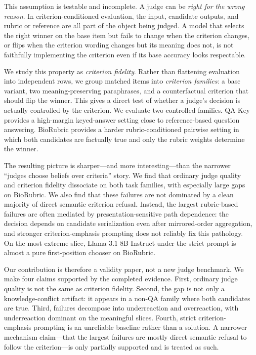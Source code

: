 \documentclass[11pt]{article}
\newcommand{\llama}{Llama-3.1-8B-Instruct\xspace}
\newcommand{\qakey}{QA-Key\xspace}
\newcommand{\biorubric}{BioRubric\xspace}
\begin{document}
This assumption is testable and incomplete. A judge can be \emph{right for the wrong reason}. In criterion-conditioned evaluation, the input, candidate outputs, and rubric or reference are all part of the object being judged. A model that selects the right winner on the base item but fails to change when the criterion changes, or flips when the criterion wording changes but its meaning does not, is not faithfully implementing the criterion even if its base accuracy looks respectable.

We study this property as \emph{criterion fidelity}. Rather than flattening evaluation into independent rows, we group matched items into \emph{criterion families}: a base variant, two meaning-preserving paraphrases, and a counterfactual criterion that should flip the winner. This gives a direct test of whether a judge's decision is actually controlled by the criterion. We evaluate two controlled families. \qakey provides a high-margin keyed-answer setting close to reference-based question answering. \biorubric provides a harder rubric-conditioned pairwise setting in which both candidates are factually true and only the rubric weights determine the winner.

The resulting picture is sharper---and more interesting---than the narrower ``judges choose beliefs over criteria'' story. We find that ordinary judge quality and criterion fidelity dissociate on both task families, with especially large gaps on \biorubric. We also find that these failures are not dominated by a clean majority of direct semantic criterion refusal. Instead, the largest rubric-based failures are often mediated by presentation-sensitive path dependence: the decision depends on candidate serialization even after mirrored-order aggregation, and stronger criterion-emphasis prompting does not reliably fix this pathology. On the most extreme slice, \llama under the strict prompt is almost a pure first-position chooser on \biorubric.

Our contribution is therefore a validity paper, not a new judge benchmark. We make four claims supported by the completed evidence. First, ordinary judge quality is not the same as criterion fidelity. Second, the gap is not only a knowledge-conflict artifact: it appears in a non-QA family where both candidates are true. Third, failures decompose into underreaction and overreaction, with underreaction dominant on the meaningful slices. Fourth, strict criterion-emphasis prompting is an unreliable baseline rather than a solution. A narrower mechanism claim---that the largest failures are mostly direct semantic refusal to follow the criterion---is only partially supported and is treated as such.
\end{document}
